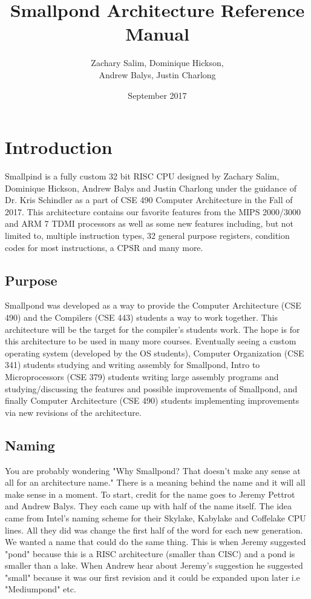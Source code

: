 \documentclass[12pt]{article}
\title{Smallpond Architecture Reference Manual}
\author{Zachary Salim, Dominique Hickson,\\ Andrew Balys, Justin Charlong}
\date{September 2017}
\begin{document}
\maketitle


\newpage
\tableofcontents

\newpage
\section{Introduction}
Smallpind is a fully custom 32 bit RISC CPU designed by Zachary Salim, Dominique Hickson, Andrew Balys and Justin Charlong under the guidance of Dr. Kris Schindler as a part of CSE 490 Computer Architecture in the Fall of 2017. This architecture contains our favorite features from the MIPS 2000/3000 and ARM 7 TDMI processors as well as some new features including, but not limited to, multiple instruction types, 32 general purpose registers, condition codes for most instructions, a CPSR and many more.
    \subsection{Purpose}
    Smallpond was developed as a way to provide the Computer Architecture (CSE 490) and the Compilers (CSE 443) students a way to work together. This architecture will be the target for the compiler's students work. The hope is for this architecture to be used in many more courses. Eventually seeing a custom operating system (developed by the OS students), Computer Organization (CSE 341) students studying and writing assembly for Smallpond, Intro to Microprocessors (CSE 379) students writing large assembly programs and studying/discussing the features and possible improvements of Smallpond, and finally Computer Architecture (CSE 490) students implementing improvements via new revisions of the architecture. 
    
    \subsection{Naming}
    You are probably wondering "Why Smallpond? That doesn't make any sense at all for an architecture name." There is a meaning behind the name and it will all make sense in a moment. To start, credit for the name goes to Jeremy Pettrot and Andrew Balys. They each came up with half of the name itself. The idea came from Intel's naming scheme for their Skylake, Kabylake and Coffelake CPU lines. All they did was change the first half of the word for each new generation. We wanted a name that could do the same thing. This is when Jeremy suggested "pond" because this is a RISC architecture (smaller than CISC) and a pond is smaller than a lake. When Andrew hear about Jeremy's suggestion he suggested "small" because it was our first revision and it could be expanded upon later i.e "Mediumpond" etc.
\newpage
\end{document}

